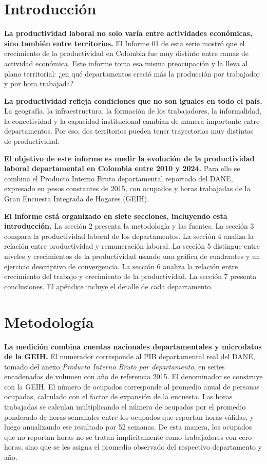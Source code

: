 \section{Introducción}

\textbf{La productividad laboral no solo varía entre actividades económicas, sino también entre territorios.} El Informe 01 de esta serie mostró que el crecimiento de la productividad en Colombia fue muy distinto entre ramas de actividad económica. Este informe toma esa misma preocupación y la lleva al plano territorial: ¿en qué departamentos creció más la producción por trabajador y por hora trabajada?

\textbf{La productividad refleja condiciones que no son iguales en todo el país.} La geografía, la infraestructura, la formación de los trabajadores, la informalidad, la conectividad y la capacidad institucional cambian de manera importante entre departamentos. Por eso, dos territorios pueden tener trayectorias muy distintas de productividad.

\textbf{El objetivo de este informe es medir la evolución de la productividad laboral departamental en Colombia entre 2010 y 2024.} Para ello se combina el Producto Interno Bruto departamental reportado del DANE, expresado en pesos constantes de 2015, con ocupados y horas trabajadas de la Gran Encuesta Integrada de Hogares (GEIH). 

\textbf{El informe está organizado en siete secciones, incluyendo esta introducción.} La sección 2 presenta la metodología y las fuentes. La sección 3 compara la productividad laboral de los departamentos. La sección 4 analiza la relación entre productividad y remuneración laboral. La sección 5 distingue entre niveles y crecimientos de la productividad usando una gráfica de cuadrantes y un ejercicio descriptivo de convergencia. La sección 6 analiza la relación entre crecimiento del trabajo y crecimiento de la productividad. La sección 7 presenta conclusiones. El apéndice incluye el detalle de cada departamento.

\section{Metodología}

\textbf{La medición combina cuentas nacionales departamentales y microdatos de la GEIH.} El numerador corresponde al PIB departamental real del DANE, tomado del anexo \textit{Producto Interno Bruto por departamento}, en series encadenadas de volumen con año de referencia 2015. El denominador se construye con la GEIH. El número de ocupados corresponde al promedio anual de personas ocupadas, calculado con el factor de expansión de la encuesta. Las horas trabajadas se calculan multiplicando el número de ocupados por el promedio ponderado de horas semanales entre los ocupados que reportan horas válidas, y luego anualizando ese resultado por 52 semanas. De esta manera, los ocupados que no reportan horas no se tratan implícitamente como trabajadores con cero horas, sino que se les asigna el promedio observado del respectivo departamento y año.

